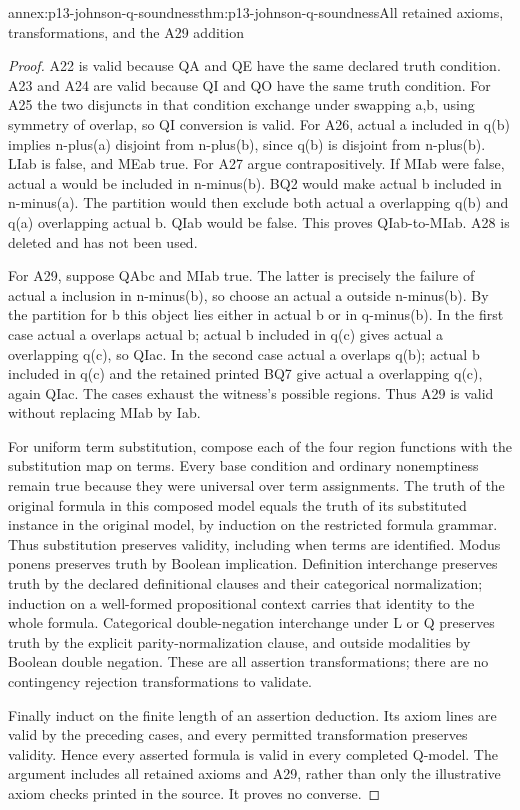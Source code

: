 \begin{annexitem}{annex:p13-johnson-q-soundness}{thm:p13-johnson-q-soundness}{All retained axioms, transformations, and the A29 addition}
\begin{proof}
A22 is valid because QA and QE have the same declared truth condition.
A23 and A24 are valid because QI and QO have the same truth condition.
For A25 the two disjuncts in that condition exchange under swapping a,b,
using symmetry of overlap, so QI conversion is valid.
For A26, actual a included in q(b) implies n-plus(a) disjoint from
n-plus(b), since q(b) is disjoint from n-plus(b). LIab is false,
and MEab true. For A27 argue contrapositively. If MIab were false,
actual a would be included in n-minus(b). BQ2 would make actual b
included in n-minus(a). The partition would then exclude both actual a
overlapping q(b) and q(a) overlapping actual b. QIab would be false.
This proves QIab-to-MIab. A28 is deleted and has not been used.

For A29, suppose QAbc and MIab true. The latter is precisely the
failure of actual a inclusion in n-minus(b), so choose an actual a
outside n-minus(b). By the partition for b this object lies either
in actual b or in q-minus(b). In the first case actual a overlaps
actual b; actual b included in q(c) gives actual a overlapping q(c),
so QIac. In the second case actual a overlaps q(b); actual b included
in q(c) and the retained printed BQ7 give actual a overlapping q(c),
again QIac. The cases exhaust the witness's possible regions.
Thus A29 is valid without replacing MIab by Iab.

For uniform term substitution, compose each of the four region functions
with the substitution map on terms. Every base condition and ordinary
nonemptiness remain true because they were universal over term assignments.
The truth of the original formula in this composed model equals the truth
of its substituted instance in the original model, by induction on the
restricted formula grammar. Thus substitution preserves validity, including
when terms are identified. Modus ponens preserves truth by Boolean
implication. Definition interchange preserves truth by the declared
definitional clauses and their categorical normalization; induction on a
well-formed propositional context carries that identity to the whole formula.
Categorical double-negation interchange under L or Q preserves truth by the
explicit parity-normalization clause, and outside modalities by Boolean
double negation. These are all assertion transformations; there are no
contingency rejection transformations to validate.

Finally induct on the finite length of an assertion deduction. Its axiom
lines are valid by the preceding cases, and every permitted transformation
preserves validity. Hence every asserted formula is valid in every completed
Q-model. The argument includes all retained axioms and A29, rather than only
the illustrative axiom checks printed in the source. It proves no converse.
\end{proof}
\end{annexitem}

